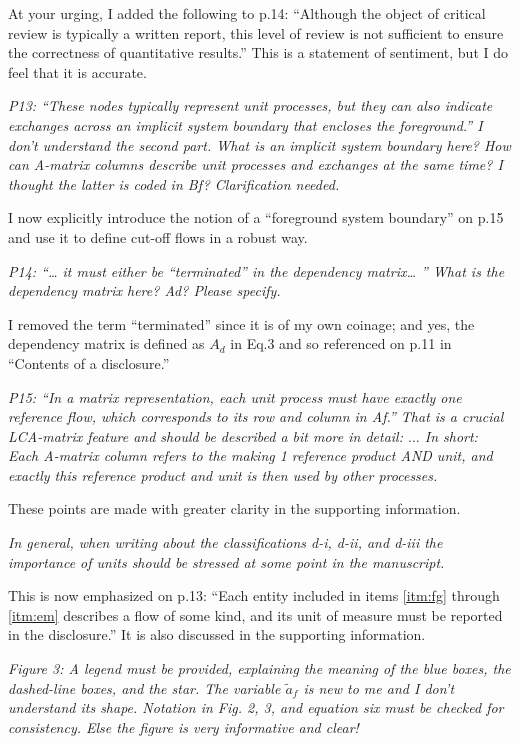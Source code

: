 \documentclass[11pt,letterpaper]{article}
\begin{document}
At your urging, I added the following to p.14: ``Although the object of critical review is typically a written report, this level of review is not sufficient to ensure the correctness of quantitative results.''  This is a statement of sentiment, but I do feel that it is accurate.

\emph{P13: “These nodes typically represent unit processes, but they can also indicate exchanges across an implicit system boundary that encloses the foreground.” I don’t understand the second part. What is an implicit system boundary here? How can A-matrix columns describe unit processes and exchanges at the same time? I thought the latter is coded in Bf? Clarification needed.}

I now explicitly introduce the notion of a ``foreground system boundary'' on p.15 and use it to define cut-off flows in a robust way.

\emph{P14: “… it must either be “terminated” in the dependency matrix… ” What is the dependency matrix here? Ad? Please specify.}

I removed the term ``terminated'' since it is of my own coinage; and yes, the dependency matrix is defined as $A_d$ in Eq.3 and so referenced on p.11 in ``Contents of a disclosure.''

\emph{P15: “In a matrix representation, each unit process must have exactly one reference flow, which
  corresponds to its row and column in Af.” That is a crucial LCA-matrix feature and should be described a bit more in detail: $\ldots$ In short: Each A-matrix column refers to the making 1 reference product AND unit, and exactly this reference product and unit is then used by other processes.}

These points are made with greater clarity in the supporting information.

\emph{In general, when writing about the classifications d-i, d-ii, and d-iii the importance of units should be stressed at some point in the manuscript.}

This is now emphasized on p.13: ``Each entity included in items \ref{itm:fg} through \ref{itm:em} describes a flow of some kind, and its unit of measure must be reported in the disclosure.''  It is also discussed in the supporting information.

\emph{Figure 3: A legend must be provided, explaining the meaning of the blue boxes, the dashed-line boxes, and the star. The variable $\tilde{a}_f$ is new to me and I don’t understand its shape. Notation in Fig. 2, 3, and equation six must be checked for consistency. Else the figure is very informative and clear!}
\end{document}
